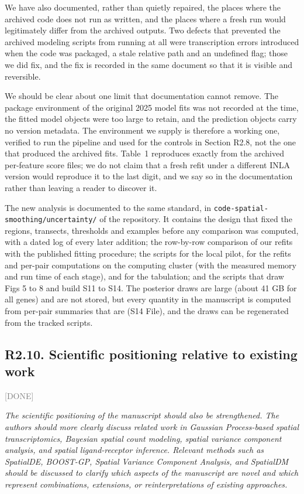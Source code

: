 \documentclass[11pt]{article}
\newcommand{\status}[1]{\textcolor{gray}{\small\textsf{[#1]}}}
\newenvironment{rev}{\begin{leftbar}\itshape\small}{\end{leftbar}}
\begin{document}
We have also documented, rather than quietly repaired, the places where the archived code
does not run as written, and the places where a fresh run would legitimately differ from the
archived outputs. Two defects that prevented the archived modeling scripts from running at
all were transcription errors introduced when the code was packaged, a stale relative path
and an undefined flag; those we did fix, and the fix is recorded in the same document so that
it is visible and reversible.

We should be clear about one limit that documentation cannot remove. The package environment
of the original 2025 model fits was not recorded at the time, the fitted model objects were
too large to retain, and the prediction objects carry no version metadata. The environment we
supply is therefore a working one, verified to run the pipeline and used for the controls in
Section R2.8, not the one that produced the archived fits. Table~1 reproduces exactly from
the archived per-feature score files; we do not claim that a fresh refit under a different
INLA version would reproduce it to the last digit, and we say so in the documentation rather
than leaving a reader to discover it.

The new analysis is documented to the same standard, in \texttt{code-spatial-smoothing/uncertainty/}
of the repository. It contains the design that fixed the regions, transects, thresholds and
examples before any comparison was computed, with a dated log of every later addition; the
row-by-row comparison of our refits with the published fitting procedure; the scripts for the
local pilot, for the refits and per-pair computations on the computing cluster (with the measured
memory and run time of each stage), and for the tabulation; and the scripts that draw Figs 5 to 8
and build S11 to S14. The posterior draws are large (about 41 GB for all genes) and are not
stored, but every quantity in the manuscript is computed from per-pair summaries that are (S14
File), and the draws can be regenerated from the tracked scripts.

\subsection{R2.10. Scientific positioning relative to existing work} \status{DONE}

\begin{rev}
The scientific positioning of the manuscript should also be strengthened. The authors
should more clearly discuss related work in Gaussian Process-based spatial transcriptomics,
Bayesian spatial count modeling, spatial variance component analysis, and spatial
ligand-receptor inference. Relevant methods such as SpatialDE, BOOST-GP, Spatial Variance
Component Analysis, and SpatialDM should be discussed to clarify which aspects of the
manuscript are novel and which represent combinations, extensions, or reinterpretations of
existing approaches.
\end{rev}
\end{document}
